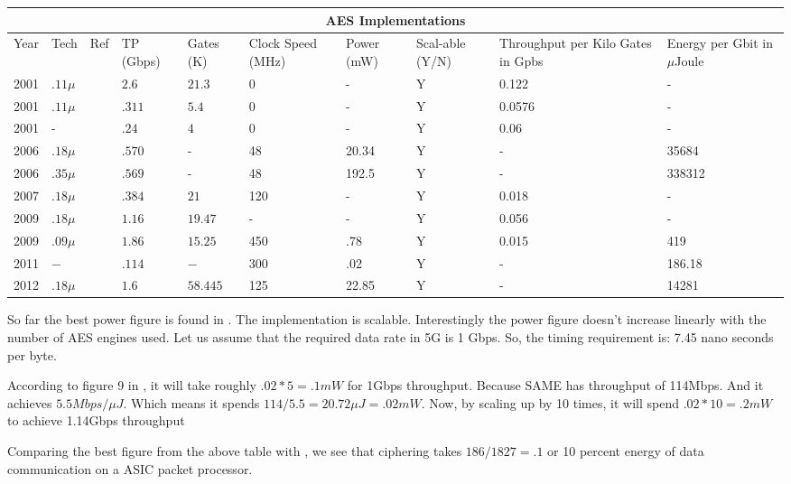 \documentclass[12pt]{article}
\begin{document}
\begin{tabular}{ |p{1cm}|p{.7cm}|p{.5cm}|p{1.2cm}|p{1cm}|p{1cm}|p{1cm}|p{1cm}|p{2cm}|p{1cm}|}
\hline
\multicolumn{10}{|c|}{AES Implementations} \\
\hline
Year &Tech &Ref &TP (Gbps) &Gates (K) & Clock Speed (MHz)&Power (mW) & Scal-able (Y/N) & Throughput per Kilo Gates in Gpbs & Energy per Gbit in $\mu$Joule \\ \hline
2001 & $.11 \mu$ & \cite{IBM_Japan_2001} &$2.6$ &$21.3$  & 0& - & Y & 0.122 & - \\ \hline
2001 & $.11 \mu$ & \cite{IBM_Japan_2001} &$.311$ &$5.4$  & 0& - & Y & 0.0576 & - \\ \hline
2001 & - & \cite{IBM_India_IIT_2001} &$.24$ &$4$  & 0& - & Y & 0.06 & - \\ \hline
2006 & $.18 \mu$ & \cite{Taiwan_2006} &$.570$ & - & 48&20.34 &Y & - & 35684 \\ \hline
2006 & $.35 \mu$ & \cite{Taiwan_2006} &$.569$ & - & 48&192.5 &Y & - & 338312 \\ \hline
2007 & $.18 \mu$ & \cite{IIT_Kharagpur_2007} &$.384$ &$21$ & 120&- &Y & 0.018 & - \\ \hline
2009 & $.18 \mu$ & \cite{IME_China_Tsinghua_Univerisity_2009} &$1.16$ &$19.47$ & - & - &Y & 0.056 & - \\ \hline
2009 & $.09 \mu$ & \cite{Ruhr_2009} &$1.86$ &$15.25$ & 450&.78 &Y & 0.015 & 419 \\ \hline
2011 & $ - $ & \cite{Ruhr_2011} &$.114$ &$ - $ & 300&.02 &Y & -  & 186.18 \\ \hline
2012 & $.18 \mu$ & \cite{Pune_2012} &$1.6$ &$58.445$ & 125&22.85 &Y & - & 14281 \\ \hline
\end{tabular}



So far the best power figure is found in \cite{Ruhr_2009}. The implementation is scalable. Interestingly the power figure doesn't increase linearly with the number of AES engines used. Let us assume that the required data rate in 5G is 1 Gbps. So, the timing requirement is: 7.45 nano seconds per byte. 


According to figure 9 in \cite{Ruhr_2011}, it will take roughly $.02*5=.1 mW$ for 1Gbps throughput. Because SAME has throughput of 114Mbps. And it achieves $5.5Mbps/ \mu J$. Which means it spends $114/5.5 = 20.72\mu J = .02 mW$. Now, by scaling up by 10 times, it will spend $.02*10=.2mW$ to achieve 1.14Gbps throughput


Comparing the best figure from the above table with \cite{KTH_2014}, we see that ciphering takes $186/1827=.1$ or 10 percent energy of data communication on a ASIC packet processor.
\end{document}
